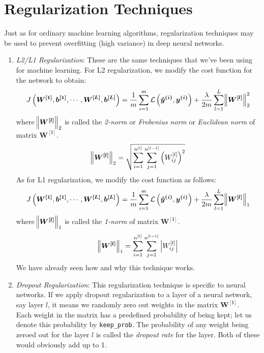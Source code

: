 \documentclass[a4paper, 12pt]{report}
\begin{document}
\section{Regularization Techniques}
Just as for ordinary machine learning algorithms, regularization techniques may be used to prevent overfitting (high variance) in deep neural networks.\\
\begin{enumerate}
\item \textit{L2/L1 Regularization}: These are the same techniques that we've been using for machine learning. For L2 regularization, we modify the cost function for the network to obtain:
\begin{align*}
J\left(\bm{W^{[1]}}, \bm{b^{[1]}}, \cdots, \bm{W^{[L]}}, \bm{b^{[L]}}\right) = \dfrac{1}{m}\sum_{i=1}^{m}\mathcal{L}\left(\bm{\hat{y}^{(i)}}, \bm{y^{(i)}}\right) + \dfrac{\lambda}{2m}\sum_{l=1}^{L}\norm{\bm{W^{[l]}}}_2^2
\end{align*}
where $\norm{\bm{W^{[l]}}}_2$ is called the \textit{2-norm} or \textit{Frobenius norm} or \textit{Euclidean norm} of matrix $\bm{W^{[l]}}$.
\begin{align*}
\norm{\bm{W^{[l]}}}_2 = \sqrt{\sum_{i=1}^{n^{[l]}}\sum_{j=1}^{n^{[l-1]}}\left(W_{ij}^{[l]}\right)^2}
\end{align*}
As for L1 regularization, we modify the cost function as follows:
\begin{align*}
J\left(\bm{W^{[1]}}, \bm{b^{[1]}}, \cdots, \bm{W^{[L]}}, \bm{b^{[L]}}\right) = \dfrac{1}{m}\sum_{i=1}^{m}\mathcal{L}\left(\bm{\hat{y}^{(i)}}, \bm{y^{(i)}}\right) + \dfrac{\lambda}{2m}\sum_{l=1}^{L}\norm{\bm{W^{[l]}}}_1
\end{align*}
where $\norm{\bm{W^{[l]}}}_1$ is called the \textit{1-norm} of matrix $\bm{W^{[l]}}$.\\
\begin{align*}
\norm{\bm{W^{[l]}}}_1 = \sum_{i=1}^{n^{[l]}}\sum_{j=1}^{n^{[l-1]}}\left|W_{ij}^{[l]}\right|
\end{align*}
We have already seen how and why this technique works.
\item \textit{Dropout Regularization}: This regularization technique is specific to neural networks. If we apply dropout regularization to a layer of a neural network, say layer $l$, it means we randomly zero out weights in the matrix $\bm{W^{[l]}}$.\\
\break
Each weight in the matrix has a predefined probability of being kept; let us denote this probability by \texttt{keep\_prob}. The probability of any weight being zeroed out for the layer $l$ is called the \textit{dropout rate} for the layer. Both of these would obviously add up to 1.\\

\end{enumerate}
\end{document}
